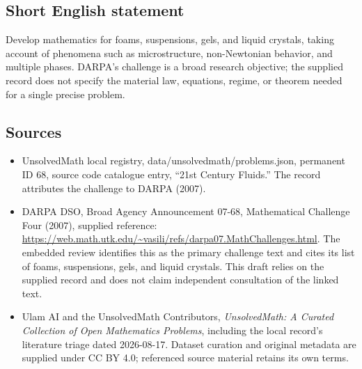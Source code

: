 \documentclass[11pt]{article}
\begin{document}
\subsection{Short English statement}
Develop mathematics for foams, suspensions, gels, and liquid crystals, taking account of phenomena such as microstructure, non-Newtonian behavior, and multiple phases. DARPA's challenge is a broad research objective; the supplied record does not specify the material law, equations, regime, or theorem needed for a single precise problem.
\subsection{Sources}
\begin{itemize}
\item UnsolvedMath local registry, data/unsolvedmath/problems.json, permanent ID 68, source code catalogue entry, ``21st Century Fluids.'' The record attributes the challenge to DARPA (2007).
\item DARPA DSO, Broad Agency Announcement 07-68, Mathematical Challenge Four (2007), supplied reference: \url{https://web.math.utk.edu/~vasili/refs/darpa07.MathChallenges.html}. The embedded review identifies this as the primary challenge text and cites its list of foams, suspensions, gels, and liquid crystals. This draft relies on the supplied record and does not claim independent consultation of the linked text.
\item Ulam AI and the UnsolvedMath Contributors, \emph{UnsolvedMath: A Curated Collection of Open Mathematics Problems}, including the local record's literature triage dated 2026-08-17. Dataset curation and original metadata are supplied under CC BY 4.0; referenced source material retains its own terms.
\end{itemize}
\end{document}
